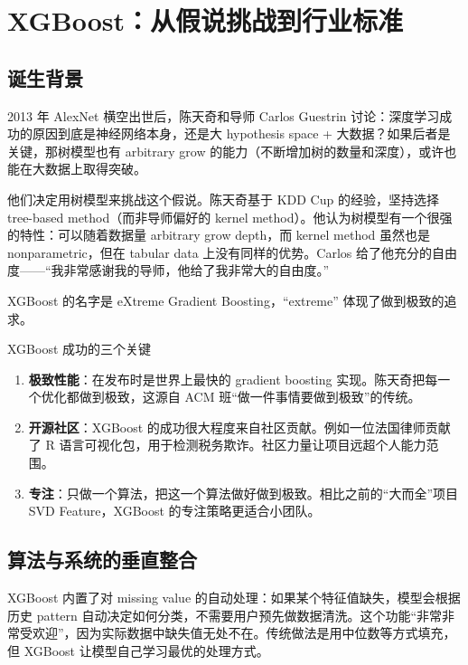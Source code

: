 \documentclass[a4paper]{article}
\begin{document}
\section{XGBoost：从假说挑战到行业标准}

\subsection{诞生背景}

2013 年 AlexNet 横空出世后，陈天奇和导师 Carlos Guestrin 讨论：深度学习成功的原因到底是神经网络本身，还是大 hypothesis space + 大数据？如果后者是关键，那树模型也有 arbitrary grow 的能力（不断增加树的数量和深度），或许也能在大数据上取得突破。

他们决定用树模型来挑战这个假说。陈天奇基于 KDD Cup 的经验，坚持选择 tree-based method（而非导师偏好的 kernel method）。他认为树模型有一个很强的特性：可以随着数据量 arbitrary grow depth，而 kernel method 虽然也是 nonparametric，但在 tabular data 上没有同样的优势。Carlos 给了他充分的自由度------``我非常感谢我的导师，他给了我非常大的自由度。''

XGBoost 的名字是 eXtreme Gradient Boosting，``extreme'' 体现了做到极致的追求。

\begin{importantbox}{XGBoost 成功的三个关键}
\begin{enumerate}
    \item \textbf{极致性能}：在发布时是世界上最快的 gradient boosting 实现。陈天奇把每一个优化都做到极致，这源自 ACM 班``做一件事情要做到极致''的传统。
    \item \textbf{开源社区}：XGBoost 的成功很大程度来自社区贡献。例如一位法国律师贡献了 R 语言可视化包，用于检测税务欺诈。社区力量让项目远超个人能力范围。
    \item \textbf{专注}：只做一个算法，把这一个算法做好做到极致。相比之前的``大而全''项目 SVD Feature，XGBoost 的专注策略更适合小团队。
\end{enumerate}
\end{importantbox}

\subsection{算法与系统的垂直整合}

XGBoost 内置了对 missing value 的自动处理：如果某个特征值缺失，模型会根据历史 pattern 自动决定如何分类，不需要用户预先做数据清洗。这个功能``非常非常受欢迎''，因为实际数据中缺失值无处不在。传统做法是用中位数等方式填充，但 XGBoost 让模型自己学习最优的处理方式。
\end{document}
